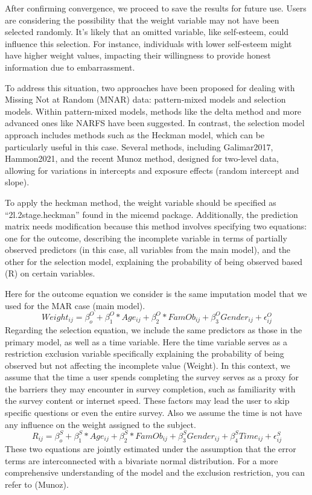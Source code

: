 \documentclass[
]{jss}
\begin{document}
After confirming convergence, we proceed to save the results for future
use. Users are considering the possibility that the weight variable may
not have been selected randomly. It's likely that an omitted variable,
like self-esteem, could influence this selection. For instance,
individuals with lower self-esteem might have higher weight values,
impacting their willingness to provide honest information due to
embarrassment.

To address this situation, two approaches have been proposed for dealing
with Missing Not at Random (MNAR) data: pattern-mixed models and
selection models. Within pattern-mixed models, methods like the delta
method and more advanced ones like NARFS have been suggested. In
contrast, the selection model approach includes methods such as the
Heckman model, which can be particularly useful in this case. Several
methods, including Galimar2017, Hammon2021, and the recent Munoz method,
designed for two-level data, allowing for variations in intercepts and
exposure effects (random intercept and slope).

To apply the heckman method, the weight variable should be specified as
``2l.2stage.heckman'' found in the micemd package. Additionally, the
prediction matrix needs modification because this method involves
specifying two equations: one for the outcome, describing the incomplete
variable in terms of partially observed predictors (in this case, all
variables from the main model), and the other for the selection model,
explaining the probability of being observed based (R) on certain
variables.

Here for the outcome equation we consider is the same imputation model
that we used for the MAR case (main model).
\[Weight_{ij}= \beta^O_{o} + \beta^O_{1}* Age_{ij} + \beta^O_{2}*FamOb_{ij}+ \beta^O_{3}Gender_{ij} + \epsilon^O_{ij}\]
Regarding the selection equation, we include the same predictors as
those in the primary model, as well as a time variable. Here the time
variable serves as a restriction exclusion variable specifically
explaining the probability of being observed but not affecting the
incomplete value (Weight). In this context, we assume that the time a
user spends completing the survey serves as a proxy for the barriers
they may encounter in survey completion, such as familiarity with the
survey content or internet speed. These factors may lead the user to
skip specific questions or even the entire survey. Also we assume the
time is not have any influence on the weight assigned to the subject.
\[R_{ij}= \beta^S_{o} + \beta^S_{1}* Age_{ij} + \beta^S_{2}*FamOb_{ij}+ \beta^S_{3}Gender_{ij} +\beta^S_{4}Time_{ij}+ \epsilon^S_{ij}\]
These two equations are jointly estimated under the assumption that the
error terms are interconnected with a bivariate normal distribution. For
a more comprehensive understanding of the model and the exclusion
restriction, you can refer to (Munoz).
\end{document}
